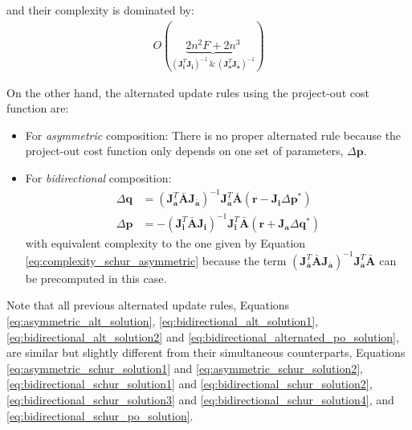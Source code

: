 and their complexity is dominated by:
\begin{equation}
    \begin{aligned}
        O(\underbrace{2n^2F + 2n^3}_{(\mathbf{J}_{\mathbf{i}}^T\mathbf{J}_{\mathbf{i}})^{-1} \, \& \, (\mathbf{J}_{\mathbf{a}}^T\mathbf{J}_{\mathbf{a}})^{-1}})
    \label{eq:complexity_alternated_bidirectional2}
    \end{aligned}
\end{equation}

On the other hand, the alternated update rules using the project-out cost function are:
\begin{itemize}
	\item For \emph{asymmetric} composition:
	There is no proper alternated rule because the project-out cost function only depends on one set of parameters, $\Delta \mathbf{p}$.
	\item For \emph{bidirectional} composition:
	\begin{equation}
	    \begin{aligned}
	        \Delta \mathbf{q} & = \left( \mathbf{J}_{\bar{\mathbf{a}}}^T\bar{\mathbf{A}}\mathbf{J}_{\bar{\mathbf{a}}} \right)^{-1} \mathbf{J}_{\bar{\mathbf{a}}}^T\bar{\mathbf{A}} \left( \mathbf{r} - \mathbf{J}_{\mathbf{i}} \Delta\mathbf{p}^* \right)
	        \\
	        \Delta \mathbf{p} & = -\left( \mathbf{J}_{\mathbf{i}}^T\bar{\mathbf{A}}\mathbf{J}_{\mathbf{i}} \right)^{-1} \mathbf{J}_\mathbf{i}^T \bar{\mathbf{A}} \left( \mathbf{r} + \mathbf{J}_{\mathbf{a}} \Delta\mathbf{q}^* \right)
	    \label{eq:bidirectional_alternated_po_solution}
	    \end{aligned}
	\end{equation}
	with equivalent complexity to the one given by Equation \ref{eq:complexity_schur_asymmetric} because the term $\left( \mathbf{J}_{\bar{\mathbf{a}}}^T \bar{\mathbf{A}} \mathbf{J}_{\bar{\mathbf{a}}} \right)^{-1} \mathbf{J}_{\bar{\mathbf{a}}}^T \bar{\mathbf{A}}$ can be precomputed in this case.
\end{itemize}

Note that all previous alternated update rules, Equations \ref{eq:asymmetric_alt_solution}, \ref{eq:bidirectional_alt_solution1}, \ref{eq:bidirectional_alt_solution2} and \ref{eq:bidirectional_alternated_po_solution}, are similar but slightly different from their simultaneous counterparts, Equations \ref{eq:asymmetric_schur_solution1} and \ref{eq:asymmetric_schur_solution2}, \ref{eq:bidirectional_schur_solution1} and \ref{eq:bidirectional_schur_solution2}, \ref{eq:bidirectional_schur_solution3} and \ref{eq:bidirectional_schur_solution4}, and \ref{eq:bidirectional_schur_po_solution}.


